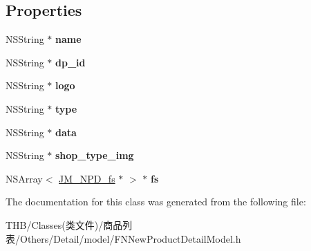 \subsection*{Properties}
\begin{DoxyCompactItemize}
\item 
\mbox{\label{interface_j_m___n_p_d__dp_arr_ab78d9021f4a7eef81dd4af4f664db49c}} 
N\+S\+String $\ast$ {\bfseries name}
\item 
\mbox{\label{interface_j_m___n_p_d__dp_arr_a0852009d34d6fc63a05b09362734cc7e}} 
N\+S\+String $\ast$ {\bfseries dp\+\_\+id}
\item 
\mbox{\label{interface_j_m___n_p_d__dp_arr_ae07968161f617a32fda986c48d85f180}} 
N\+S\+String $\ast$ {\bfseries logo}
\item 
\mbox{\label{interface_j_m___n_p_d__dp_arr_ab0acb54699548c9ae4c254ef91a292a2}} 
N\+S\+String $\ast$ {\bfseries type}
\item 
\mbox{\label{interface_j_m___n_p_d__dp_arr_a398689e7573a46470def86e322f21793}} 
N\+S\+String $\ast$ {\bfseries data}
\item 
\mbox{\label{interface_j_m___n_p_d__dp_arr_a28f646d4690abf210474fcfa5e55a134}} 
N\+S\+String $\ast$ {\bfseries shop\+\_\+type\+\_\+img}
\item 
\mbox{\label{interface_j_m___n_p_d__dp_arr_a2a65c09c4a96f7f34039da5f33860f8a}} 
N\+S\+Array$<$ \mbox{\hyperlink{interface_j_m___n_p_d__fs}{J\+M\+\_\+\+N\+P\+D\+\_\+fs}} $\ast$ $>$ $\ast$ {\bfseries fs}
\end{DoxyCompactItemize}


The documentation for this class was generated from the following file\+:\begin{DoxyCompactItemize}
\item 
T\+H\+B/\+Classes(类文件)/商品列表/\+Others/\+Detail/model/F\+N\+New\+Product\+Detail\+Model.\+h\end{DoxyCompactItemize}
